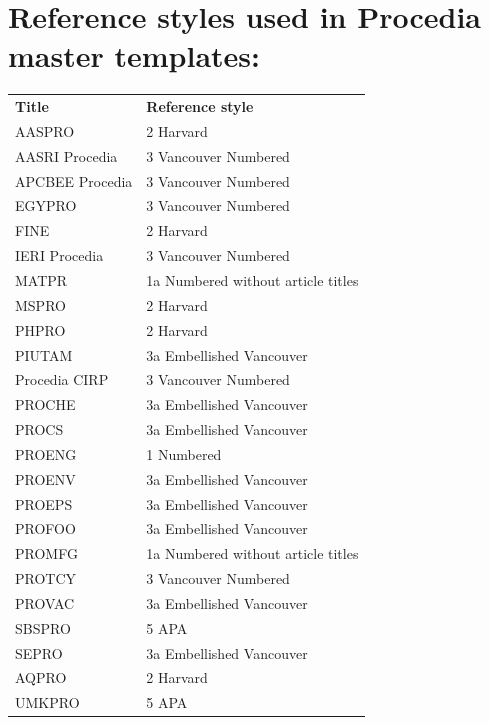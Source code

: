 \documentclass[3p,times,procedia,twocolumn,twoside]{elsarticle}
\begin{document}
\section{Reference styles used in  Procedia master templates:}
\let\footnotesize\normalsize
\hspace*{-10pt}\begin{tabular*}{\hsize}{@{}ll@{}}
{\bf Title}&{\bf Reference style} \\[6pt]
AASPRO  & 2 Harvard\\
AASRI Procedia  & 3 Vancouver Numbered\\
APCBEE Procedia  & 3 Vancouver Numbered\\
EGYPRO  & 3 Vancouver Numbered\\
FINE    & 2 Harvard\\
IERI Procedia  & 3 Vancouver Numbered\\
MATPR  & 1a Numbered without article titles\\
MSPRO  & 2 Harvard\\
PHPRO  & 2 Harvard\\
PIUTAM  & 3a Embellished Vancouver \\
Procedia CIRP  & 3 Vancouver Numbered\\
PROCHE  & 3a Embellished Vancouver \\
PROCS  & 3a Embellished Vancouver \\
PROENG  & 1 Numbered\\
PROENV  & 3a Embellished Vancouver \\
PROEPS  & 3a Embellished Vancouver \\
PROFOO    & 3a Embellished Vancouver \\
PROMFG  & 1a Numbered without article titles\\
PROTCY  & 3 Vancouver Numbered\\
PROVAC  & 3a Embellished Vancouver \\
SBSPRO  & 5 APA\\
SEPRO  & 3a Embellished Vancouver \\
AQPRO & 2 Harvard\\
UMKPRO & 5 APA\\
\end{tabular*}
\end{document}
